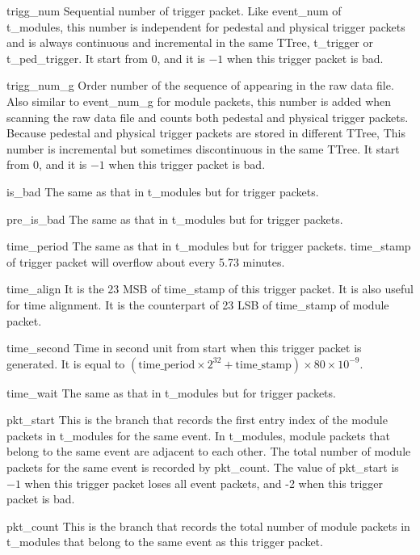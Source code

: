 \documentclass[a4paper, 12pt, onecolumn]{article}
\begin{document}
\begin{asparadesc}
\item[trigg\_num] Sequential number of trigger packet.
  Like event\_num of \\ t\_modules, this number is independent for pedestal and physical trigger packets
  and is always continuous and incremental in the same TTree, t\_trigger or t\_ped\_trigger.
  It start from 0, and it is $-1$ when this trigger packet is bad.
\item[trigg\_num\_g] Order number of the sequence of appearing in the raw data file.
  Also similar to event\_num\_g for module packets, this number is added when scanning the raw data file and counts both pedestal and physical trigger packets.
  Because pedestal and physical trigger packets are stored in different TTree, This number is incremental but sometimes discontinuous in the same TTree.
  It start from 0, and it is $-1$ when this trigger packet is bad.
\item[is\_bad] The same as that in t\_modules but for trigger packets.
\item[pre\_is\_bad] The same as that in t\_modules but for trigger packets.
\item[time\_period] The same as that in t\_modules but for trigger packets. time\_stamp of trigger packet will overflow about every 5.73 minutes.
\item[time\_align] It is the 23 MSB of time\_stamp of this trigger packet. It is also useful for time alignment.
  It is the counterpart of 23 LSB of time\_stamp of module packet.
\item[time\_second] Time in second unit from start when this trigger packet is generated.
  It is equal to $(\textrm{time\_period} \times 2^{32} + \textrm{time\_stamp}) \times 80 \times 10^{-9}$.
\item[time\_wait] The same as that in t\_modules but for trigger packets.
\item[pkt\_start] This is the branch that records the first entry index of the module packets in t\_modules for the same event.
  In t\_modules, module packets that belong to the same event are adjacent to each other. The total number of module packets for the same event is recorded by pkt\_count.
  The value of pkt\_start is $-1$ when this trigger packet loses all event packets, and -2 when this trigger packet is bad.
\item[pkt\_count] This is the branch that records the total number of module packets in t\_modules that belong to the same event as this trigger packet.

\end{asparadesc}
\end{document}
